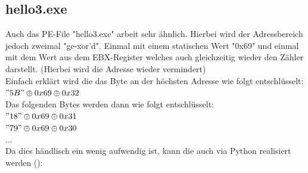 \documentclass{article}
\begin{document}
	\subsection{hello3.exe}
	Auch das PE-File "hello3.exe" arbeit sehr ähnlich. Hierbei wird der Adressbereich jedoch zweimal "ge-xor'd". Einmal mit einem statischen Wert "0x69" und einmal mit dem Wert aus dem EBX-Register welches auch gleichzeitig wieder den Zähler darstellt. (Hierbei wird die Adresse wieder vermindert)\\
	Einfach erklärt wird die das Byte an der höchsten Adresse wie folgt entschlüsselt:\\
	\("5B" \oplus 0x69 \oplus 0x32\)\\
	Das folgenden Bytes werden dann wie folgt entschlüsselt:\\
	\("18" \oplus 0x69 \oplus 0x31\)\\
	\("79" \oplus 0x69 \oplus 0x30\)\\
	...\\
	Da dies händlisch ein wenig aufwendig ist, kann die auch via Python realisiert werden ():
\end{document}
